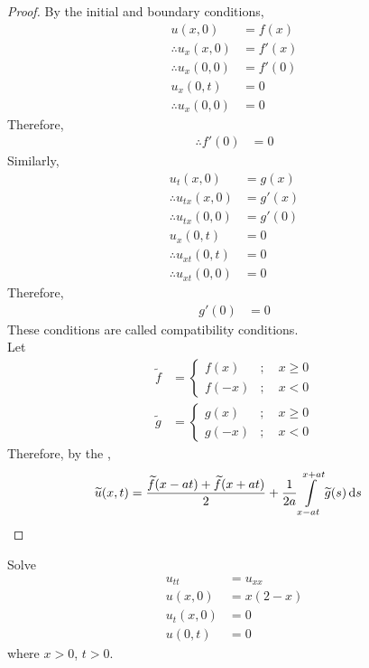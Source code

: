 \documentclass[titlepage, fleqn, a4paper, 12pt, twoside]{article}
\theoremstyle{definition}
\theoremstyle{theorem}
\renewcommand{\tilde}{\widetilde}
\begin{document}
\begin{proof}
	By the initial and boundary conditions,
	\begin{align*}
		u(x,0)              & = f(x)  \\
		\therefore u_x(x,0) & = f'(x) \\
		\therefore u_x(0,0) & = f'(0) \\
		u_x(0,t)            & = 0     \\
		\therefore u_x(0,0) & = 0
	\end{align*}
	Therefore,
	\begin{align*}
		\therefore f'(0) & = 0
	\end{align*}
	Similarly,
	\begin{align*}
		u_t(x,0)                & = g(x)  \\
		\therefore u_{t x}(x,0) & = g'(x) \\
		\therefore u_{t x}(0,0) & = g'(0) \\
		u_x(0,t)                & = 0     \\
		\therefore u_{x t}(0,t) & = 0     \\
		\therefore u_{x t}(0,0) & = 0
	\end{align*}
	Therefore,
	\begin{align*}
		g'(0) & = 0
	\end{align*}
	These conditions are called compatibility conditions.\\
	Let
	\begin{align*}
		\tilde{f} &=
			\begin{cases}
				f(x)  & ;\quad x \ge 0 \\
				f(-x) & ;\quad x < 0
			\end{cases}\\
		\tilde{g} &=
			\begin{cases}
				g(x)  & ;\quad x \ge 0 \\
				g(-x) & ;\quad x < 0
			\end{cases}
	\end{align*}
	Therefore, by the ,
	\begin{align*}
		\tilde{u}(x,t) & = \frac{\tilde{f}(x - a t) + \tilde{f}(x + a t)}{2} + \frac{1}{2 a} \int\limits_{x - a t}^{x + a t} \tilde{g}(s) \dif s
	\end{align*}
\end{proof}

\begin{question}
	Solve
	\begin{align*}
		u_{t t}  & = u_{x x}   \\
		u(x,0)   & = x (2 - x) \\
		u_t(x,0) & = 0         \\
		u(0,t)   & = 0
	\end{align*}
	where $x > 0$, $t > 0$.
\end{question}
\end{document}
